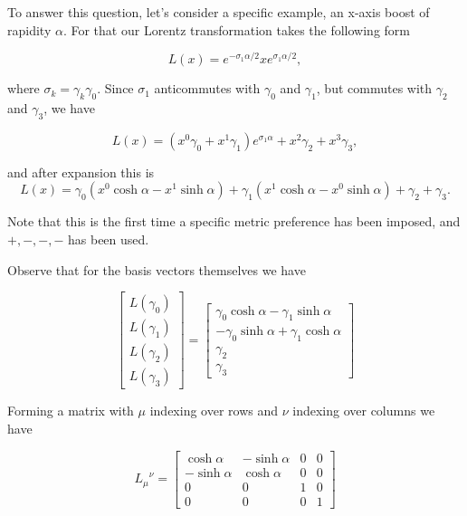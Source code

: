 To answer this question, let's consider a specific example, an x-axis boost of rapidity $\alpha$.  For that our Lorentz transformation takes the following form

\begin{equation}\label{eqn:antisymmetricTensorTx:430}
L(x) = e^{-\sigma_1 \alpha/2} x e^{\sigma_1 \alpha/2},
\end{equation}

where $\sigma_k = \gamma_k \gamma_0$.  Since $\sigma_1$ anticommutes with $\gamma_0$ and $\gamma_1$, but commutes with $\gamma_2$ and $\gamma_3$, we have

\begin{equation}\label{eqn:antisymmetricTensorTx:440}
L(x) = (x^0 \gamma_0 + x^1 \gamma_1) e^{\sigma_1 \alpha} + x^2 \gamma_2 + x^3 \gamma_3,
\end{equation}

and after expansion this is
\begin{equation}\label{eqn:antisymmetricTensorTx:441}
L(x) = 
\gamma_0 ( x^0 \cosh \alpha - x^1 \sinh \alpha ) 
+\gamma_1 ( x^1 \cosh \alpha - x^0 \sinh \alpha )
+\gamma_2
+\gamma_3.
\end{equation}

Note that this is the first time a specific metric preference has been imposed, and $+,-,-,-$ has been used.

Observe that for the basis vectors themselves we have

\begin{equation}\label{eqn:antisymmetricTensorTx:450}
\begin{bmatrix}
L(\gamma_0) \\
L(\gamma_1) \\
L(\gamma_2) \\
L(\gamma_3)
\end{bmatrix}
=
\begin{bmatrix}
\gamma_0 \cosh \alpha - \gamma_1 \sinh \alpha \\
-\gamma_0 \sinh \alpha + \gamma_1 \cosh \alpha \\
\gamma_2 \\
\gamma_3
\end{bmatrix}
\end{equation}

Forming a matrix with $\mu$ indexing over rows and $\nu$ indexing over columns we have

\begin{equation}\label{eqn:antisymmetricTensorTx:460}
{L_\mu}^\nu =
\begin{bmatrix}
\cosh \alpha &- \sinh \alpha & 0 & 0 \\
-\sinh \alpha & \cosh \alpha & 0 & 0 \\
0 & 0 & 1 & 0 \\
0 & 0 & 0 & 1
\end{bmatrix}
\end{equation}

